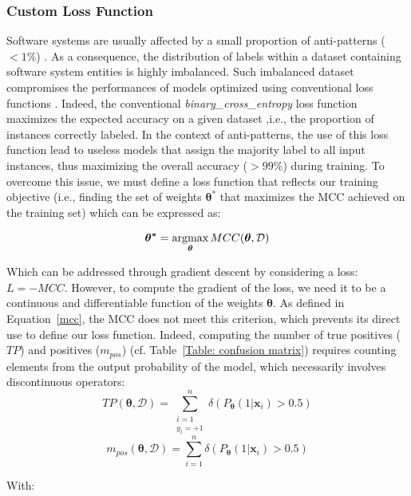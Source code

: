 \subsubsection{Custom Loss Function}
\label{section: loss}
Software systems are usually affected by a small proportion of anti-patterns ($<1\%$) \cite{palomba2018diffuseness}. As a consequence, the distribution of labels within a dataset containing software system entities is highly imbalanced. Such imbalanced dataset compromises the performances of models optimized using conventional loss functions \cite{he2008learning}. Indeed, the conventional \textit{binary\_cross\_entropy} loss function maximizes the expected accuracy on a given dataset ,i.e., the proportion of instances correctly labeled. In the context of anti-patterns, the use of this loss function lead to useless models that assign the majority label to all input instances, thus maximizing the overall accuracy ($>99\%$) during training. To overcome this issue, we must define a loss function that reflects our training objective (i.e., finding the set of weights $\bm{\theta^{*}}$ that maximizes the MCC achieved on the training set) which can be expressed as:

\begin{equation}
\bm{\theta^{*}} = \operatorname*{argmax}_{\bm{\theta}} MCC(\bm{\theta}, \mathcal{D})
\end{equation}

Which can be addressed through gradient descent by considering a loss: $L = - MCC$. However, to compute the gradient of the loss, we need it to be a continuous and differentiable function of the weights $\bm{\theta}$. As defined in Equation~\ref{mcc}, the MCC does not meet this criterion, which prevents its direct use to define our loss function. Indeed, computing the number of true positives ($TP$) and positives ($m_{pos}$) (cf. Table~\ref{Table: confusion matrix}) requires counting elements from the output probability of the model, which necessarily involves discontinuous operators:
\begin{equation}
TP(\bm{\theta}, \mathcal{D}) = \sum_{\substack{i=1 \\ y_{i} = +1}}^{n} \delta(P_{\bm{\theta}}(1|\textbf{x}_{i}) > 0.5)
\end{equation}
\begin{equation}
m_{pos}(\bm{\theta}, \mathcal{D}) = \sum_{i=1}^{n} \delta(P_{\bm{\theta}}(1|\textbf{x}_{i}) > 0.5)
\end{equation}

With:

